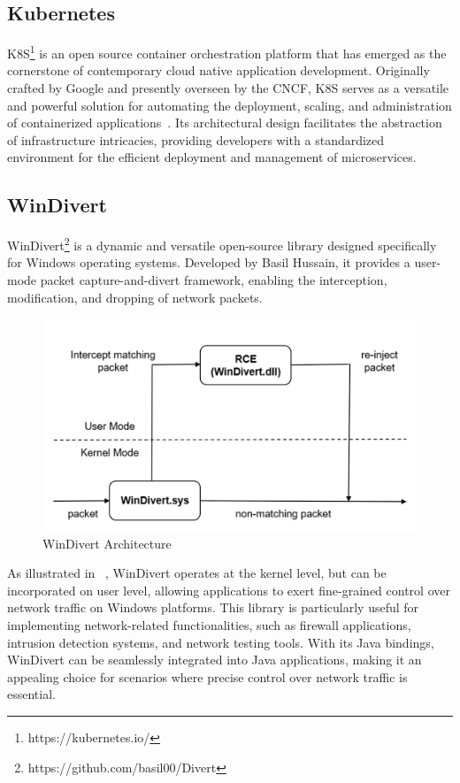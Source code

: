 \subsection{Kubernetes}
\label{subsec:kubernetes}
\acf{K8S}\footnote{https://kubernetes.io/} is an open source container orchestration platform that has emerged as the cornerstone of contemporary cloud native application development. Originally crafted by Google and presently overseen by the \ac{CNCF}, \ac{K8S} serves as a versatile and powerful solution for automating the deployment, scaling, and administration of containerized applications~\cite{burns2022kubernetes}. Its architectural design facilitates the abstraction of infrastructure intricacies, providing developers with a standardized environment for the efficient deployment and management of microservices.~\cite{noauthor_production-grade_nodate}

\subsection{WinDivert}
\label{subsec:windivert}
WinDivert\footnote{https://github.com/basil00/Divert} is a dynamic and versatile open-source library designed specifically for Windows operating systems. Developed by Basil Hussain, it provides a user-mode packet capture-and-divert framework, enabling the interception, modification, and dropping of network packets.

\begin{figure}
    \centering
    \includegraphics[width=\linewidth]{files/figures/WinDivert.png}
    \caption{WinDivert Architecture}
    \label{fig:WinDivert}
\end{figure}

As illustrated in ~, WinDivert operates at the kernel level, but can be incorporated on user level, allowing applications to exert fine-grained control over network traffic on Windows platforms. This library is particularly useful for implementing network-related functionalities, such as firewall applications, intrusion detection systems, and network testing tools. With its Java bindings, WinDivert can be seamlessly integrated into Java applications, making it an appealing choice for scenarios where precise control over network traffic is essential.~\cite{noauthor_windivert:_nodate}

